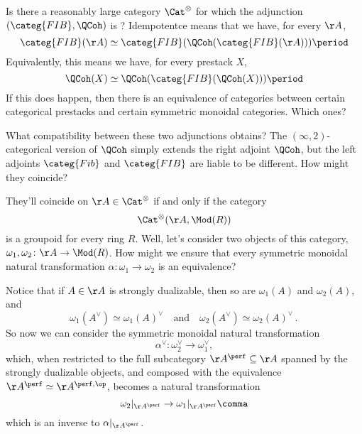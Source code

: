 \documentclass[leqno]{article}
\begin{document}
\begin{qst}
    Is there a reasonably large category \(\Cat^{\otimes}\) for which
    the adjunction \((\categ{FIB},\QCoh)\) is ?
    Idempotentce means that we have, for every \(\AA\), 
    \begin{equation*}
        \categ{FIB}(\AA) \simeq
        \categ{FIB}(\QCoh(\categ{FIB}(\AA))) \period
    \end{equation*}
    Equivalently, this means we have, for every prestack \(X\),
    \begin{equation*}
        \QCoh(X) \simeq 
        \QCoh(\categ{FIB}(\QCoh(X))) \period
    \end{equation*}
    If this does happen, then there is an equivalence of categories
    between certain categorical prestacks and
    certain symmetric monoidal categories.
    Which ones?
\end{qst}

What compatibility between these two adjunctions obtains?
The \((\infty,2)\)-categorical version of \(\QCoh\) simply extends
the right adjoint \(\QCoh\), but the left adjoints
\(\categ{Fib}\) and \(\categ{FIB}\) are liable to be different.
How might they coincide?

They'll coincide on \(\AA \in \Cat^{\otimes}\) if and only if
the category
\begin{equation*}
    \Cat^{\otimes}(\AA, \Mod(R))
\end{equation*}
is a groupoid for every ring \(R\).
Well, let's consider two objects of this category,
\(\omega_{1}, \omega_{2} \colon \AA \to \Mod(R)\).
How might we ensure that every symmetric monoidal
natural transformation
\(\alpha \colon \omega_{1} \to \omega_{2}\)
is an equivalence?

Notice that if \(A \in \AA\) is strongly dualizable,
then so are \(\omega_{1}(A)\) and \(\omega_{2}(A)\), and
\begin{equation*}
    \omega_{1}(A^{\vee}) \simeq \omega_{1}(A)^{\vee}
    \quad \text{and} \quad
    \omega_{2}(A^{\vee}) \simeq \omega_{2}(A)^{\vee} \period
\end{equation*}
So now we can consider the symmetric monoidal
natural transformation
\begin{equation*}
    \alpha^{\vee} \colon \omega_{2}^{\vee} \to \omega_{1}^{\vee}
    \comma
\end{equation*}
which, when restricted to the full subcategory
\(\AA^{\perf} \subseteq \AA\)
spanned by the strongly dualizable objects,
and composed with the equivalence
\(\AA^{\perf} \simeq \AA^{\perf,\op}\),
becomes a natural transformation
\begin{equation*}
    \omega_{2}|_{\AA^{\perf}}
    \to
    \omega_{1}|_{\AA^{\perf}} \comma
\end{equation*}
which is an inverse to \(\alpha|_{\AA^{\perf}}\).
\end{document}
